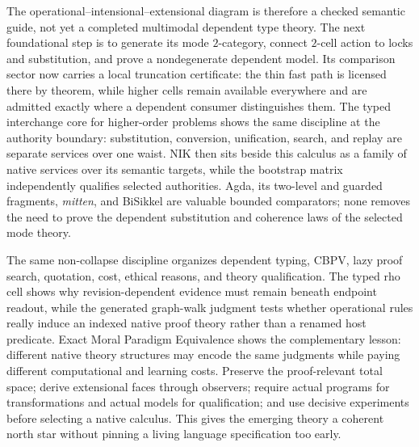 \documentclass[11pt]{article}
\theoremstyle{definition}
\theoremstyle{remark}
\begin{document}
The operational--intensional--extensional diagram is therefore a checked
semantic guide, not yet a completed multimodal dependent type theory.  The next
foundational step is to generate its mode $2$-category, connect $2$-cell action
to locks and substitution, and prove a nondegenerate dependent model.  Its
comparison sector now carries a local truncation certificate: the thin fast
path is licensed there by theorem, while higher cells remain available
everywhere and are admitted exactly where a dependent consumer distinguishes
them.  The typed interchange core for higher-order problems shows the same
discipline at the authority boundary: substitution, conversion, unification,
search, and replay are separate services over one waist.  NIK then
sits beside this calculus as a family of native services over its semantic
targets, while the
bootstrap matrix independently qualifies selected authorities.  Agda, its
two-level and guarded fragments, \emph{mitten}, and BiSikkel are valuable bounded
comparators; none removes the need to prove the dependent substitution and
coherence laws of the selected mode theory.

The same non-collapse discipline organizes dependent typing, CBPV, lazy proof
search, quotation, cost, ethical reasons, and theory qualification.  The typed
rho cell shows why revision-dependent evidence must remain beneath endpoint
readout, while the generated graph-walk judgment tests whether operational rules
really induce an indexed native proof theory rather than a renamed host
predicate.  Exact Moral Paradigm Equivalence shows the complementary lesson:
different native theory structures may encode the same judgments while paying
different computational and learning costs.  Preserve the proof-relevant total
space; derive extensional faces through observers; require actual programs for
transformations and actual models for qualification; and use decisive
experiments before selecting a native calculus.  This gives the emerging theory
a coherent north star without pinning a living language specification too early.
\end{document}
